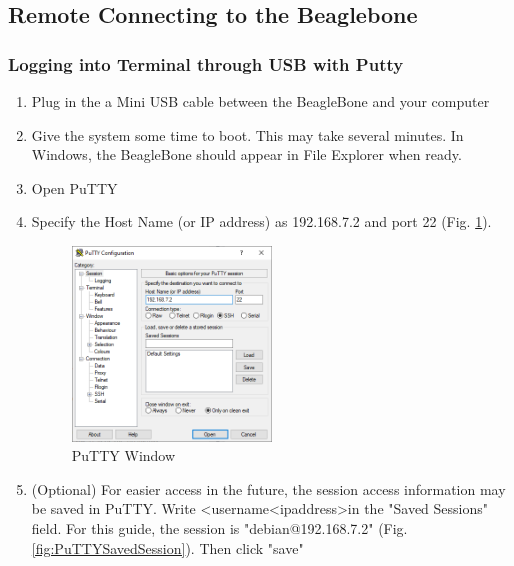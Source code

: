     \subsection{Remote Connecting to the Beaglebone}
        

        \subsubsection{Logging into Terminal through USB with Putty}

            \begin{enumerate}
                \item Plug in the a Mini USB cable between the BeagleBone and your computer
                \item Give the system some time to boot. This may take several minutes. In Windows, the BeagleBone should appear in File Explorer when ready.
                \item Open PuTTY
                \item Specify the Host Name (or IP address) as 192.168.7.2 and port 22 (Fig. \ref{fig:PuTTY Window}). 
                    \begin{figure}[H]
                        \centering
                        \includegraphics[width=0.5\textwidth]{images/beagleboneblack_truckcape_v4_images/PuttyWindow.png}
                        \caption{PuTTY Window}
                        \label{fig:PuTTY Window}
                    \end{figure}
                \item (Optional) For easier access in the future, the session access information may be saved in PuTTY. Write \textless username\textgreater@\textless ipaddress\textgreater  in the "Saved Sessions" field. For this guide, the session is "debian@192.168.7.2" (Fig. \ref{fig:PuTTYSavedSession}). Then click "save"
                \begin{figure}[h]

\end{figure}
\end{enumerate}
